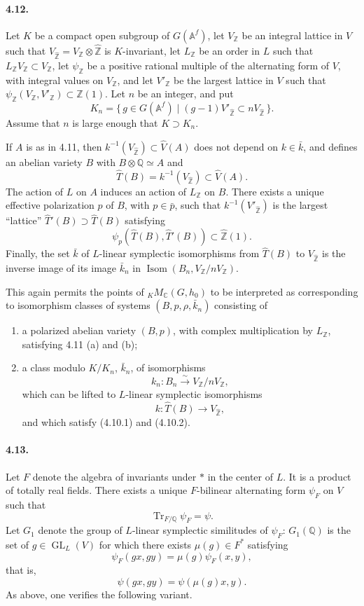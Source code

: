 \documentclass[10pt]{article}
\newcommand{\Af}{\mathbb A^f}
\newcommand{\C}{\mathbb C}
\newcommand{\Q}{\mathbb Q}
\newcommand{\Z}{\mathbb Z}
\newcommand{\GL}{\operatorname{GL}}
\newcommand{\Isom}{\operatorname{Isom}}
\newcommand{\Tr}{\operatorname{Tr}}
\begin{document}
\paragraph{4.12.} Let $K$ be a compact open subgroup of $G(\Af)$, let $V_\Z$ be an integral lattice in $V$ such that $V_{\widehat{\Z}}=V_\Z\otimes\widehat{\Z}$ is $K$-invariant, let $L_\Z$ be an order in $L$ such that $L_\Z V_\Z\subset V_\Z$, let $\psi_\Z$ be a positive rational multiple of the alternating form of $V$, with integral values on $V_\Z$, and let $V'_\Z$ be the largest lattice in $V$ such that $\psi_\Z(V_\Z,V'_\Z)\subset \Z(1)$. Let $n$ be an integer, and put
\[
K_n=\{\,g\in G(\Af)\mid (g-1)V'_{\widehat{\Z}}\subset nV_{\widehat{\Z}}\,\}.
\]
Assume that $n$ is large enough that $K\supset K_n$.

If $A$ is as in 4.11, then $k^{-1}(V_{\widehat{\Z}})\subset\widehat V(A)$ does not depend on $k\in\bar k$, and defines an abelian variety $B$ with $B\otimes\Q\simeq A$ and
\[
\widehat T(B)=k^{-1}(V_{\widehat{\Z}})\subset\widehat V(A).
\]
The action of $L$ on $A$ induces an action of $L_\Z$ on $B$. There exists a unique effective polarization $p$ of $B$, with $p\in\bar p$, such that $k^{-1}(V'_{\widehat{\Z}})$ is the largest ``lattice'' $\widehat T'(B)\supset\widehat T(B)$ satisfying
\[
\psi_p(\widehat T(B),\widehat T'(B))\subset \widehat{\Z}(1).
\]
Finally, the set $\bar k$ of $L$-linear symplectic isomorphisms from $\widehat T(B)$ to $V_{\widehat{\Z}}$ is the inverse image of its image $\bar k_n$ in $\Isom(B_n,V_\Z/nV_\Z)$.

This again permits the points of ${}_K M_{\C}(G,h_0)$ to be interpreted as corresponding to isomorphism classes of systems $(B,p,\rho,\bar k_n)$ consisting of
\begin{enumerate}[label=(\alph*)]
\item a polarized abelian variety $(B,p)$, with complex multiplication by $L_\Z$, satisfying 4.11 (a) and (b);
\item a class modulo $K/K_n$, $\bar k_n$, of isomorphisms
\[
k_n:B_n\xrightarrow{\sim}V_\Z/nV_\Z,
\]
which can be lifted to $L$-linear symplectic isomorphisms
\[
k:\widehat T(B)\longrightarrow V_{\widehat{\Z}},
\]
and which satisfy (4.10.1) and (4.10.2).
\end{enumerate}

\paragraph{4.13.} Let $F$ denote the algebra of invariants under $*$ in the center of $L$. It is a product of totally real fields. There exists a unique $F$-bilinear alternating form $\psi_F$ on $V$ such that
\[
\Tr_{F/\Q}\psi_F=\psi.
\]
Let $G_1$ denote the group of $L$-linear symplectic similitudes of $\psi_F$: $G_1(\Q)$ is the set of $g\in\GL_L(V)$ for which there exists $\mu(g)\in F^*$ satisfying
\[
\tag{4.13.1}
\psi_F(gx,gy)=\mu(g)\psi_F(x,y),
\]
that is,
\[
\tag{4.13.2}
\psi(gx,gy)=\psi(\mu(g)x,y).
\]
As above, one verifies the following variant.
\end{document}
